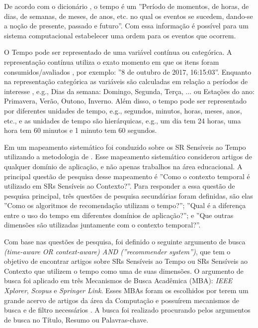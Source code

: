 De acordo com o dicionário , o tempo é um  ''Período de momentos, de horas, de dias,
de semanas, de meses, de anos, etc. no qual os eventos se sucedem, dando-se a noção de presente, passado e futuro''.
Com essa informação é possível para um sistema computacional estabelecer uma ordem para os eventos que ocorrem.

O Tempo pode ser representado de uma variável contínua ou categórica. A representação contínua utiliza o exato momento
em que os itens foram consumidos/avaliados \cite{campos2014time}, por exemplo: ''8 de outubro de 2017, 16:15:03''.
Enquanto na representação categórica as variáveis são calculadas em relação a períodos de interesse \cite{campos2014time},
e.g., Dias da semana: {Domingo, Segunda, Terça, ...} ou Estações do ano: {Primavera, Verão, Outono, Inverno}. Além
disso, o tempo pode ser representado por diferentes unidades de tempo, e.g., segundos, minutos, horas, meses, anos,
etc., e as unidades de tempo são hierárquicas, e.g., um dia tem 24 horas, uma hora tem 60 minutos e 1 minuto tem 60
segundos.

Em  um mapeamento sistemático foi conduzido sobre os SR Sensíveis ao Tempo utilizando a metodologia de
. Esse mapeamento sistemático considerou artigos de qualquer domínio de aplicação,
e não apenas trabalhos na área educacional. A principal questão de pesquisa desse mapeamento é ''Como o contexto
temporal é utilizado em SRs Sensíveis ao Contexto?''. Para responder a essa questão de pesquisa principal, três questões
de pesquisa secundárias foram definidas, são elas ''Como os algoritmos de recomendação utilizam o tempo?''; ''Qual é a
diferença entre o uso do tempo em diferentes domínios de aplicação?''; e ''Que outras dimensões são utilizadas
juntamente com o contexto temporal?''.

Com base nas questões de pesquisa, foi definido o seguinte argumento de busca
\textit{(time-aware OR context-aware) AND (''recommender system'')}, que tem o objetivo de encontrar artigos sobre
SRs Sensíveis ao Tempo ou SRs Sensíveis ao Contexto que utilizem o tempo como uma de suas dimensões.
O argumento de busca foi aplicado em três Mecanismos de Busca Acadêmica (MBA): \textit{IEEE Xplorer}, \textit{Scopus} e
\textit{Springer Link}. Esses MBAs foram os escolhidos por terem um grande acervo
de artigos da área da Computação e possuírem mecanismos de busca e de filtro necessários \cite{de2017time}. A busca
foi realizado procurando pelos argumentos de busca no Título, Resumo ou Palavras-chave.

